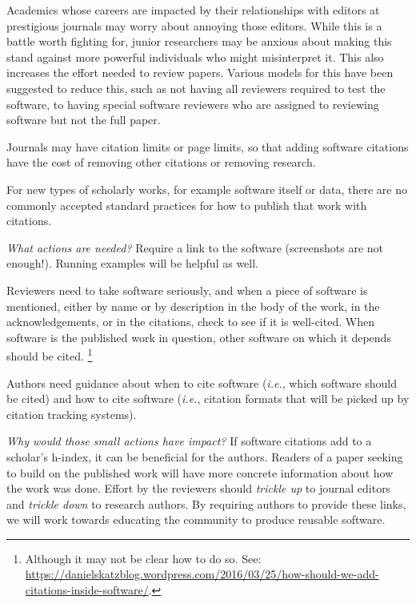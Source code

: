 \documentclass[a4paper,UKenglish]{dagman}
\newcommand{\ie}{\emph{i.e.},\xspace}
\begin{document}
Academics whose careers are impacted by their relationships with editors at prestigious journals may worry about annoying those editors. While this is a battle worth fighting for, junior researchers may be anxious about making this stand against more powerful individuals who might misinterpret it. 
This also increases the effort needed to review papers.  Various models for this have been suggested to reduce this, such as not having all reviewers required to test the software, to having special software reviewers who are assigned to reviewing software but not the full paper.

Journals may have citation limits or page limits, so that adding software citations have the cost of removing other citations or removing research.

For new types of scholarly works, for example software itself or data, there are no commonly accepted standard practices for how to publish that work with citations.

\emph{What actions are needed?}
Require a link to the software (screenshots are not enough!). Running examples will be helpful as well.

Reviewers need to take software seriously, and when a piece of software is mentioned, either by name or by description in the body of the work, in the acknowledgements, or in the citations, check to see if it is well-cited.  When software is the published work in question, other software on which it depends should be cited.%
\footnote{Although it may not be clear how to do so. See:\\ \url{https://danielskatzblog.wordpress.com/2016/03/25/how-should-we-add-citations-inside-software/}.}

Authors need guidance about when to cite software (\ie which software should be cited) and how to cite software (\ie citation formats that will be picked up by citation tracking systems). 

\emph{Why would those small actions have impact?}
If software citations add to a scholar's h-index, it can be beneficial for the authors. Readers of a paper seeking to build on the published work will have more concrete information about how the work was done. 
Effort by the reviewers should \emph{trickle up} to journal editors and \emph{trickle down} to research authors.
By requiring authors to provide these links, we will work towards educating the community to produce reusable software.
\end{document}
